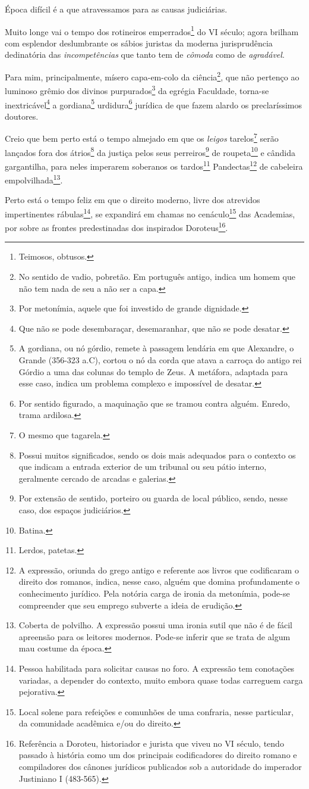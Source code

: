 Época difícil é a que atravessamos para as causas judiciárias.

Muito longe vai o tempo dos rotineiros emperrados\footnote{Teimosos,
  obtusos.} do VI século; agora brilham com esplendor deslumbrante os
sábios juristas da moderna jurisprudência dedinatória das
\emph{incompetências} que tanto tem de \emph{cômoda} como de
\emph{agradável}.

Para mim, principalmente, mísero capa-em-colo da ciência\footnote{No
  sentido de vadio, pobretão. Em português antigo, indica um homem que
  não tem nada de seu a não ser a capa.}, que não pertenço ao luminoso
grêmio dos divinos purpurados\footnote{Por metonímia, aquele que foi
  investido de grande dignidade.} da egrégia Faculdade, torna-se
inextricável\footnote{Que não se pode desembaraçar, desemaranhar, que
  não se pode desatar.} a gordiana\footnote{A gordiana, ou nó górdio,
  remete à passagem lendária em que Alexandre, o Grande (356-323 a.C),
  cortou o nó da corda que atava a carroça do antigo rei Górdio a uma
  das colunas do templo de Zeus. A metáfora, adaptada para esse caso,
  indica um problema complexo e impossível de desatar.}
urdidura\footnote{Por sentido figurado, a maquinação que se tramou
  contra alguém. Enredo, trama ardilosa.} jurídica de que fazem alardo
os preclaríssimos doutores.

Creio que bem perto está o tempo almejado em que os \emph{leigos}
tarelos\footnote{O mesmo que tagarela.} serão lançados fora dos
átrios\footnote{Possui muitos significados, sendo os dois mais
  adequados para o contexto os que indicam a entrada exterior de um
  tribunal ou seu pátio interno, geralmente cercado de arcadas e
  galerias.} da justiça pelos seus perreiros\footnote{Por extensão de
  sentido, porteiro ou guarda de local público, sendo, nesse caso, dos
  espaços judiciários.} de roupeta\footnote{Batina.} e cândida
gargantilha, para neles imperarem soberanos os tardos\footnote{Lerdos,
  patetas.} Pandectas\footnote{A expressão, oriunda do grego antigo e
  referente aos livros que codificaram o direito dos romanos, indica,
  nesse caso, alguém que domina profundamente o conhecimento jurídico.
  Pela notória carga de ironia da metonímia, pode-se compreender que seu
  emprego subverte a ideia de erudição.} de cabeleira
empolvilhada\footnote{Coberta de polvilho. A expressão possui uma
  ironia sutil que não é de fácil apreensão para os leitores modernos.
  Pode-se inferir que se trata de algum mau costume da época.}.

Perto está o tempo feliz em que o direito moderno, livre dos atrevidos
impertinentes rábulas\footnote{Pessoa habilitada para solicitar causas
  no foro. A expressão tem conotações variadas, a depender do contexto,
  muito embora quase todas carreguem carga pejorativa.}, se expandirá em
chamas no cenáculo\footnote{Local solene para refeições e comunhões de
  uma confraria, nesse particular, da comunidade acadêmica e/ou do
  direito.} das Academias, por sobre as frontes predestinadas dos
inspirados Doroteus\footnote{Referência a Doroteu, historiador e
  jurista que viveu no VI século, tendo passado à história como um dos
  principais codificadores do direito romano e compiladores dos cânones
  jurídicos publicados sob a autoridade do imperador Justiniano I
  (483-565).}.

